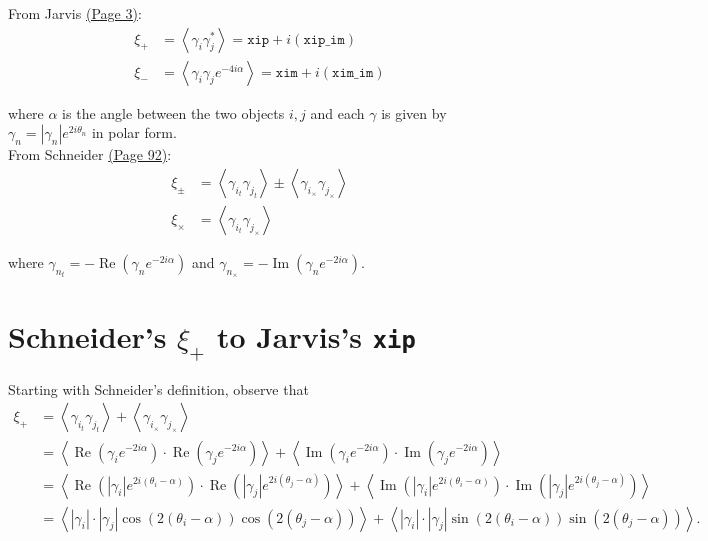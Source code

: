 \documentclass[%
 reprint,
 amsmath,amssymb,
 aps,
]{revtex4-1}
\begin{document}
From Jarvis \href{http://arxiv.org/pdf/astro-ph/0307393v2.pdf}{(Page 3)}:
\begin{align}
\xi_+&=\left<\gamma_i\gamma_j^*\right>=\texttt{xip}+i(\texttt{xip\_im})\label{s+}\\
\xi_-&=\left<\gamma_i\gamma_je^{-4i\alpha}\right>=\texttt{xim}+i(\texttt{xim\_im})\label{s-}
\end{align}

where $\alpha$ is the angle between the two objects $i,j$ and each $\gamma$ is given by $\gamma_n=|\gamma_n|e^{2i\theta_n}$ in polar form.\\

From Schneider \href{http://arxiv.org/pdf/astro-ph/0509252v1.pdf}{(Page 92)}:
\begin{align}
\xi_\pm&=\left<\gamma_{i_t}\gamma_{j_t}\right>\pm\left<\gamma_{i_\times}\gamma_{j_\times}\right>\label{s+-}\\
\xi_\times&=\left<\gamma_{i_t}\gamma_{j_\times}\right>\label{sx}
\end{align}

where $\gamma_{n_t}=-\operatorname{Re}\left(\gamma_n e^{-2i\alpha}\right)$ and $\gamma_{n_\times}=-\operatorname{Im}\left(\gamma_n e^{-2i\alpha}\right)$.\\

\section*{Schneider's $\xi_+$ to Jarvis's \texttt{xip}}

Starting with Schneider's definition, observe that
\begin{align*}
\xi_+&=\left<\gamma_{i_t}\gamma_{j_t}\right>+\left<\gamma_{i_\times}\gamma_{j_\times}\right>\\
&=\left<\operatorname{Re}\left(\gamma_ie^{-2i\alpha}\right)\cdot\operatorname{Re}\left(\gamma_je^{-2i\alpha}\right)\right>+\left<\operatorname{Im}\left(\gamma_ie^{-2i\alpha}\right)\cdot\operatorname{Im}\left(\gamma_je^{-2i\alpha}\right)\right>\\
&=\left<\operatorname{Re}\left(|\gamma_i|e^{2i(\theta_i-\alpha)}\right)\cdot\operatorname{Re}\left(|\gamma_j|e^{2i(\theta_j-\alpha)}\right)\right>+\left<\operatorname{Im}\left(|\gamma_i|e^{2i(\theta_i-\alpha)}\right)\cdot\operatorname{Im}\left(|\gamma_j|e^{2i(\theta_j-\alpha)}\right)\right>\\
&=\left<|\gamma_i|\cdot|\gamma_j|\cos\left(2(\theta_i-\alpha)\right)\cos\left(2(\theta_j-\alpha)\right)\right>+\left<|\gamma_i|\cdot|\gamma_j|\sin\left(2(\theta_i-\alpha)\right)\sin\left(2(\theta_j-\alpha)\right)\right>.
\end{align*}
\end{document}
